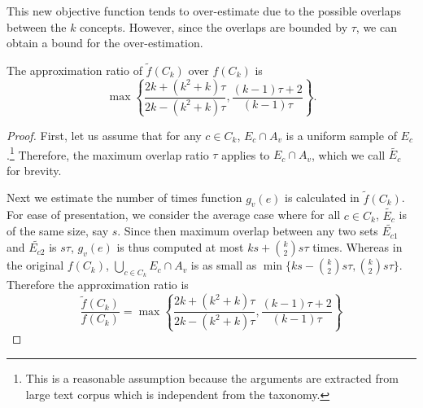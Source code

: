 This new objective function tends to over-estimate due to the
possible overlaps between the $k$ concepts.
However, since the overlaps are bounded by $\tau$,
we can obtain a bound for the over-estimation.


\begin{lemma}
The approximation ratio of $\tilde{f}(C_k)$ over $f(C_k)$ is
\[\max \left\{
	\frac{2k + (k^2 + k) \tau}{2k - (k^2 + k) \tau},
	\frac{(k-1)\tau + 2}{(k-1)\tau}\right\}.\]
\end{lemma}
\begin{proof}
First, let us assume that for any $c \in C_k$, $E_c \cap A_v$ is a uniform
sample of $E_c$.\footnote{This is a reasonable assumption because the arguments
are extracted from large text corpus which is independent from the taxonomy.}
Therefore, the maximum overlap ratio $\tau$ applies
to $E_c \cap A_v$, which we call $\tilde{E_c}$ for brevity.

Next we estimate the number of times function $g_v(e)$
is calculated in $\tilde{f}(C_k)$. For ease of presentation,
we consider the average case where for all $c \in C_k$,
$\tilde{E_c}$ is of the same size, say $s$. Since then maximum overlap
between any two sets $\tilde{E_{c1}}$ and $\tilde{E_{c2}}$ is $s\tau$,
$g_v(e)$ is thus computed at most $ks + {k\choose 2}s\tau$ times.
Whereas in the original $f(C_k)$,
$\bigcup_{c \in C_k} E_c \cap A_v$
is as small as $\min\{ks - {k\choose 2}s\tau, {k\choose2}s\tau\}$.
Therefore the approximation ratio is
\[\frac{\tilde{f}(C_k)}{f(C_k)} = \max \left\{
	\frac{2k + (k^2 + k) \tau}{2k - (k^2 + k) \tau},
	\frac{(k-1)\tau + 2}{(k-1)\tau}\right\}
\]
\end{proof}

